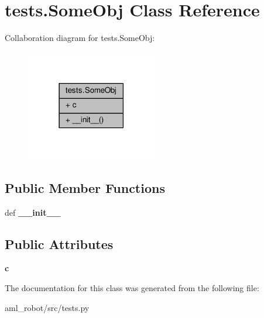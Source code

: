 \hypertarget{classtests_1_1_some_obj}{\section{tests.\-Some\-Obj Class Reference}
\label{classtests_1_1_some_obj}
}


Collaboration diagram for tests.\-Some\-Obj\-:\nopagebreak
\begin{figure}[H]
\begin{center}
\leavevmode
\includegraphics[width=162pt]{classtests_1_1_some_obj__coll__graph}
\end{center}
\end{figure}
\subsection*{Public Member Functions}
\begin{DoxyCompactItemize}
\item 
\hypertarget{classtests_1_1_some_obj_ae4cab4310d5313ab6b73d9d8ac0a8393}{def {\bfseries \-\_\-\-\_\-init\-\_\-\-\_\-}}\label{classtests_1_1_some_obj_ae4cab4310d5313ab6b73d9d8ac0a8393}

\end{DoxyCompactItemize}
\subsection*{Public Attributes}
\begin{DoxyCompactItemize}
\item 
\hypertarget{classtests_1_1_some_obj_ad442c35720f3dd0172c277d3bb4e9316}{{\bfseries c}}\label{classtests_1_1_some_obj_ad442c35720f3dd0172c277d3bb4e9316}

\end{DoxyCompactItemize}


The documentation for this class was generated from the following file\-:\begin{DoxyCompactItemize}
\item 
aml\-\_\-robot/src/tests.\-py\end{DoxyCompactItemize}
